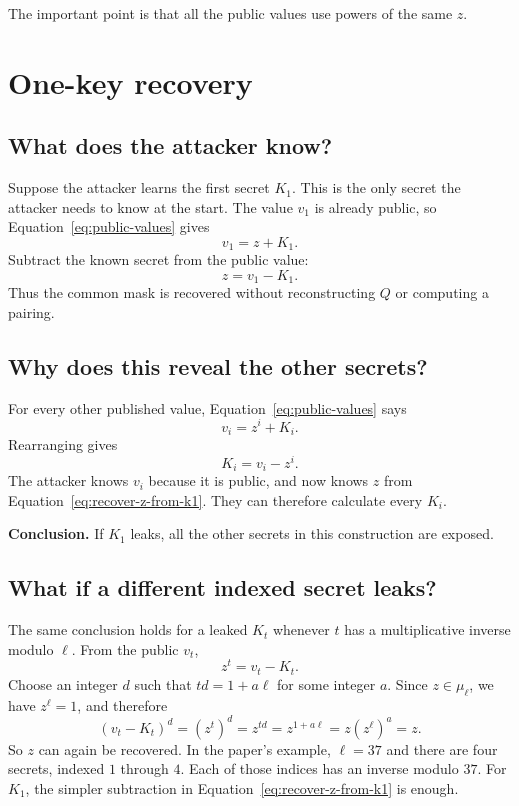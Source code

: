 \documentclass[11pt]{article}
\begin{document}
The important point is that all the public values use powers of the same $z$.

\section{One-key recovery}

\subsection{What does the attacker know?}

Suppose the attacker learns the first secret $K_1$. This is the only secret the attacker needs to know at the start. The value $v_1$ is already public, so Equation~\eqref{eq:public-values} gives
\[
    v_1=z+K_1.
\]
Subtract the known secret from the public value:
\begin{equation}
    \boxed{z=v_1-K_1.}
    \label{eq:recover-z-from-k1}
\end{equation}
Thus the common mask is recovered without reconstructing $Q$ or computing a pairing.

\subsection{Why does this reveal the other secrets?}

For every other published value, Equation~\eqref{eq:public-values} says
\[
    v_i=z^i+K_i.
\]
Rearranging gives
\begin{equation}
    \boxed{K_i=v_i-z^i.}
    \label{eq:recover-all}
\end{equation}
The attacker knows $v_i$ because it is public, and now knows $z$ from Equation~\eqref{eq:recover-z-from-k1}. They can therefore calculate every $K_i$.

\textbf{Conclusion.} If $K_1$ leaks, all the other secrets in this construction are exposed.

\subsection{What if a different indexed secret leaks?}

The same conclusion holds for a leaked $K_t$ whenever $t$ has a multiplicative inverse modulo $\ell$. From the public $v_t$,
\[
    z^t=v_t-K_t.
\]
Choose an integer $d$ such that $td=1+a\ell$ for some integer $a$. Since $z\in\mu_\ell$, we have $z^\ell=1$, and therefore
\[
    (v_t-K_t)^d=(z^t)^d=z^{td}
    =z^{1+a\ell}=z(z^\ell)^a=z.
\]
So $z$ can again be recovered. In the paper's example, $\ell=37$ and there are four secrets, indexed $1$ through $4$. Each of those indices has an inverse modulo $37$. For $K_1$, the simpler subtraction in Equation~\eqref{eq:recover-z-from-k1} is enough.
\end{document}
